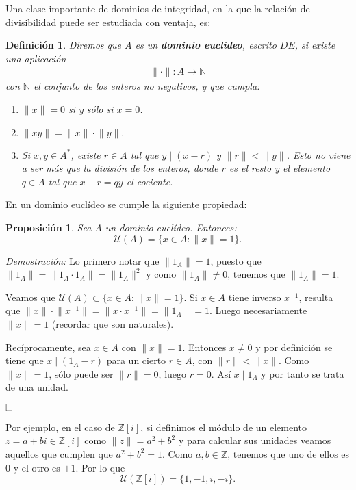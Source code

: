 \documentclass[12pt]{article}
\newtheorem{proposition}[theorem]{Proposición}
\newtheorem{definition}[theorem]{Definición}
\providecommand{\norm}[1]{\lVert#1\rVert}
\begin{document}
Una clase importante de dominios de integridad, en la que la relación de divisibilidad puede ser estudiada con ventaja, es:

\begin{definition} \label{eq:de} Diremos que $A$ es un \textbf{dominio euclídeo}, escrito $DE$, si existe una aplicación $$\begin{array}{rccl}
\norm{\cdot}\colon A\longrightarrow \mathbb{N}
\end{array}
$$
con $\mathbb{N}$ el conjunto de los enteros no negativos, y que cumpla: \begin{enumerate}
\item $\norm{x} = 0$ si y sólo si $x = 0$.
\item $\norm{xy} = \norm{x} \cdot \norm{y}.$
\item Si $x, y \in A^{\ast}$, existe $r \in A$ tal que $y \mid (x-r)$ y $\norm{r} < \norm{y}$. Esto no viene a ser más que la división de los enteros, donde $r$ es el resto y el elemento $q \in A$ tal que $x-r = qy$ el cociente. 
\end{enumerate}
\end{definition}

En un dominio euclídeo se cumple la siguiente propiedad:

\begin{proposition} Sea $A$ un dominio euclídeo. Entonces: $$\mathcal{U}(A) = \lbrace x \in A : \norm{x} = 1 \rbrace.$$
\end{proposition}
\emph{Demostración: } Lo primero notar que $\norm{1_{A}} = 1$, puesto que $\norm{1_{A}} = \norm{1_{A}\cdot 1_{A}} = \norm{1_{A}}^{2}$ y como $\norm{1_{A}} \neq 0$, tenemos que $\norm{1_{A}} = 1$.

Veamos que $\mathcal{U}(A) \subset \lbrace x \in A : \norm{x} = 1 \rbrace$. Si $x \in A$ tiene inverso $x^{-1}$, resulta que $\norm{x} \cdot \norm{x^{-1}} = \norm{x\cdot x^{-1}} = \norm{1_{A}} = 1.$ Luego necesariamente $\norm{x} = 1$ (recordar que son naturales).

Recíprocamente, sea $x \in A$ con $\norm{x} = 1$. Entonces $x \neq 0$ y por definición se tiene que $x \mid (1_{A}-r)$ para un cierto $r \in A$, con $\norm{r} < \norm{x}.$ Como $\norm{x} = 1$, sólo puede ser $\norm{r} = 0$, luego $r = 0$. Así $x \mid 1_{A}$ y por tanto se trata de una unidad. 
 
$\hfill \square$

Por ejemplo, en el caso de $\mathbb{Z}[i]$, si definimos el módulo de un elemento $z = a+bi \in \mathbb{Z}[i]$ como $\norm{z} = a^{2} + b^{2}$ y para calcular sus unidades veamos aquellos que cumplen que $a^{2} + b^{2} = 1$. Como $a,b \in \mathbb{Z}$, tenemos que uno de ellos es $0$ y el otro es $\pm 1$. Por lo que $$\mathcal{U}(\mathbb{Z}[i]) = \lbrace 1, -1, i, -i \rbrace.$$
\end{document}
